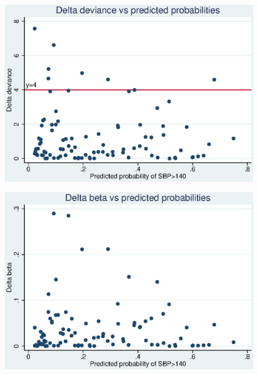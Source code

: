 \documentclass{article}
\begin{document}
\begin{enumerate}
    \begin{figure}
    \centering
    \includegraphics[width=\figwidths]{04/part4_Deltadevi_p_.eps}
    \end{figure} 
    
    \begin{figure}
    \centering
    \includegraphics[width=\figwidths]{04/part4_Deltabeta_p_.eps}
    \end{figure} 


\end{enumerate}
\end{document}
